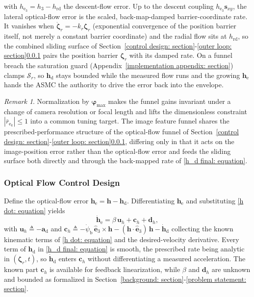 \documentclass{IEEEtaes}
\theoremstyle{definition}
\theoremstyle{remark}
\newtheorem{remark}{Remark}
\begin{document}
with $h_{\text{e}_3}=h_3-h_\text{rd}$ the descent-flow error. Up to the descent coupling $h_{\text{e}_3}\boldsymbol{s}_{xy}$, the lateral optical-flow error is the scaled, back-map-damped barrier-coordinate rate. It vanishes when $\dot{\boldsymbol{\zeta}}_r=-k_r\boldsymbol{\zeta}_r$ (exponential convergence of the position barrier itself, not merely a constant barrier coordinate) and the radial flow sits at $h_\text{rd}$, so the combined sliding surface of Section~\ref{control design: section}-\ref{outer loop: section}\ref{optic flow control: section} pairs the position barrier $\boldsymbol{\zeta}_r$ with its damped rate. On a funnel breach the saturation guard (Appendix~\ref{implementation appendix: section}) clamps $\mathcal{S}_r$, so $\boldsymbol{h}_\text{d}$ stays bounded while the measured flow runs and the growing $\boldsymbol{h}_\text{e}$ hands the ASMC the authority to drive the error back into the envelope.
\begin{remark}\label{rem:normalization} Normalization by $\boldsymbol{\varphi}_\text{max}$ makes the funnel gains invariant under a change of camera resolution or focal length and lifts the dimensionless constraint $|\bar{r}_{\text{e}_k}|\le 1$ into a common tuning target. The image feature funnel shares the prescribed-performance structure of the optical-flow funnel of Section~\ref{control design: section}-\ref{outer loop: section}\ref{optic flow control: section}, differing only in that it acts on the image-position error rather than the optical-flow error and feeds the sliding surface both directly and through the back-mapped rate of \eqref{h_d final: equation}.\end{remark}

\subsubsection{Optical Flow Control Design} \label{optic flow control: section}
Define the optical-flow error $\boldsymbol{h}_\text{e}=\boldsymbol{h}-\boldsymbol{h}_\text{d}$. Differentiating $\boldsymbol{h}_\text{e}$ and substituting \eqref{h dot: equation} yields
\begin{equation} \label{h_e_dot_1: equation}
    \dot{\boldsymbol{h}}_\text{e} = \beta\,\boldsymbol{u}_h + \boldsymbol{c}_h + \boldsymbol{d}_h,
\end{equation}
with $\boldsymbol{u}_h \triangleq -\boldsymbol{a}_\text{d}$ and $\boldsymbol{c}_h \triangleq -\dot{\psi}_\text{b}\,\hat{\boldsymbol{e}}_3\times\boldsymbol{h} - (\boldsymbol{h}\cdot\hat{\boldsymbol{e}}_3)\,\boldsymbol{h} - \dot{\boldsymbol{h}}_\text{d}$ collecting the known kinematic terms of \eqref{h dot: equation} and the desired-velocity derivative. Every term of $\boldsymbol{h}_\text{d}$ in \eqref{h_d final: equation} is smooth, the prescribed rate being analytic in $(\boldsymbol{\zeta}_r,t)$, so $\dot{\boldsymbol{h}}_\text{d}$ enters $\boldsymbol{c}_h$ without differentiating a measured acceleration. The known part $\boldsymbol{c}_h$ is available for feedback linearization, while $\beta$ and $\boldsymbol{d}_h$ are unknown and bounded as formalized in Section~\ref{background: section}-\ref{problem statement: section}.
\end{document}
